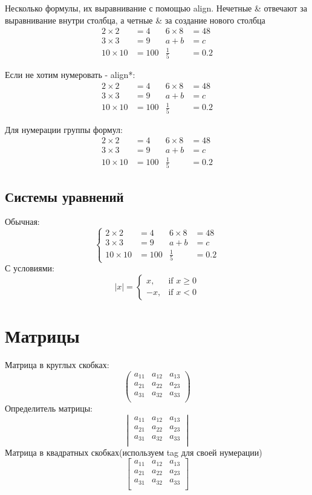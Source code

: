 \documentclass[a4paper, 12pt]{article}
\begin{document}
Несколько формулы, их выравнивание с помощью align. Нечетные \& отвечают за выравнивание внутри столбца, а четные \& за создание нового столбца
\begin{align}
2\times 2 &= 4& 6\times 8 &= 48\\
3\times 3 &= 9& a + b &= c\\
10\times 10 &= 100& \frac{1}{5} &= 0.2
\end{align}

Если не хотим нумеровать - align*:
\begin{align*}
2\times 2 &= 4& 6\times 8 &= 48\\
3\times 3 &= 9& a + b &= c\\
10\times 10 &= 100& \frac{1}{5} &= 0.2
\end{align*}

Для нумерации группы формул:
\begin{equation}
\begin{aligned}
2\times 2 &= 4& 6\times 8 &= 48\\
3\times 3 &= 9& a + b &= c\\
10\times 10 &= 100& \frac{1}{5} &= 0.2
\end{aligned}
\end{equation}


\subsection{Системы уравнений}
Обычная:
\[\left\{
\begin{aligned}
2\times 2 &= 4& 6\times 8 &= 48\\
3\times 3 &= 9& a + b &= c\\
10\times 10 &= 100& \frac{1}{5} &= 0.2
\end{aligned}\right.
\]
С условиями:
\[
|x| = \begin{cases}
x, &\text{if } x \ge 0 \\
-x, &\text{if } x < 0
\end{cases}
\]

\section{Матрицы}
Матрица в круглых скобках:
\[
\begin{pmatrix}
a_{11} & a_{12} & a_{13}\\
a_{21} & a_{22} & a_{23}\\
a_{31} & a_{32} & a_{33}\\
\end{pmatrix}
\]
Определитель матрицы:
\[
\begin{vmatrix}
a_{11} & a_{12} & a_{13}\\
a_{21} & a_{22} & a_{23}\\
a_{31} & a_{32} & a_{33}\\
\end{vmatrix}
\]
Матрица в квадратных скобках(используем tag для своей нумерации)
\[
\begin{bmatrix}
a_{11} & a_{12} & a_{13}\\
a_{21} & a_{22} & a_{23}\\
a_{31} & a_{32} & a_{33}\\
\end{bmatrix}\tag{MATRIX}
\]
\end{document}
